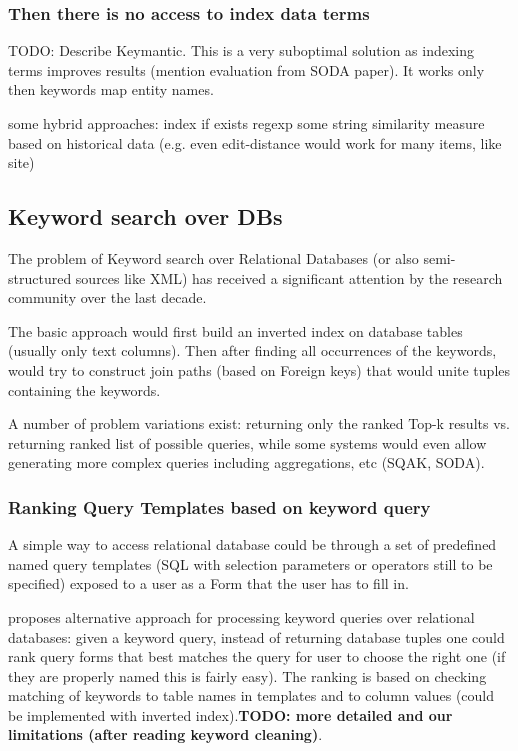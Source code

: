 \subsubsection*{Then there is no access to index data terms}
{\color{red} TODO: Describe Keymantic\cite{Keymantic10}. This is a very suboptimal solution as indexing terms improves results (mention evaluation from SODA paper). It works only then keywords map entity names.

some hybrid approaches: 
index if exists
regexp
some string similarity measure based on historical data (e.g. even edit-distance would work for many items, like site)}



\subsection{Keyword search over DBs}
The problem of Keyword search over Relational Databases (or also semi-structured sources like XML) has received a significant attention by the research community over the last decade. 

The basic approach would first build an inverted index on database tables (usually only text columns). Then after finding all occurrences of the keywords, would try to construct join paths (based on Foreign keys) that would unite tuples containing the keywords.

% 
A number of problem variations exist:  returning only the ranked Top-k results vs. returning ranked list of possible queries, while some systems would even allow generating more complex queries including aggregations, etc (SQAK, SODA\cite{ethz2012}).

\subsubsection*{Ranking Query Templates based on keyword query}
A simple way to access relational database could  be through a set of predefined named query templates (SQL with selection parameters or operators still to be specified) exposed to a user as a Form that the user has to fill in.

\cite{forms_kws} proposes alternative approach for processing keyword queries over relational databases: given a keyword query, instead of returning database tuples one could rank query forms that best matches the query for user to choose the right one (if they are properly named this is fairly easy). The ranking is based on checking matching of keywords to table names in templates and to column values (could be implemented with inverted index).\textbf{\color{red}TODO: more detailed and our limitations (after reading keyword cleaning)}.

